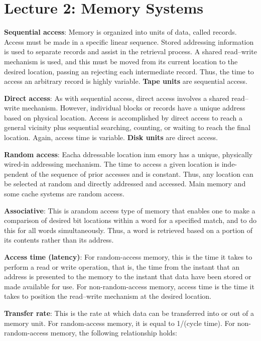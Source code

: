 \section{Lecture 2: Memory Systems}

\textbf{Sequential access}: Memory is organized into units of data, called records. Access must be made in a specific linear sequence. Stored addressing information is used to separate records and assist in the retrieval process. A shared read–write mechanism is used, and this must be moved from its current location to the desired location, passing an rejecting each intermediate record. Thus, the time to access an arbitrary record is highly variable. \textbf{Tape units}  are sequential access.

\textbf{Direct access}: As with sequential access, direct access involves a shared read–write mechanism. However, individual blocks or records have a unique address based on physical location. Access is accomplished by direct access to reach a general vicinity plus sequential searching, counting, or waiting to reach the final location. Again, access time is variable. \textbf{Disk units} are direct access.

\textbf{Random access}: Eacha ddressable location inm emory has a unique, physically wired-in addressing mechanism. The time to access a given location is inde- pendent of the sequence of prior accesses and is constant. Thus, any location can be selected at random and directly addressed and accessed. Main memory and some cache systems are random access.

\textbf{Associative}: This is arandom access type of memory that enables one to make a comparison of desired bit locations within a word for a specified match, and to do this for all words simultaneously. Thus, a word is retrieved based on a portion of its contents rather than its address.

\textbf{Access time (latency)}: For random-access memory, this is the time it takes to perform a read or write operation, that is, the time from the instant that an address is presented to the memory to the instant that data have been stored or made available for use. For non-random-access memory, access time is the time it takes to position the read–write mechanism at the desired location.

\textbf{Transfer rate}: This is the rate at which data can be transferred into or out of a memory unit. For random-access memory, it is equal to 1/(cycle time).
For non-random-access memory, the following relationship holds:

